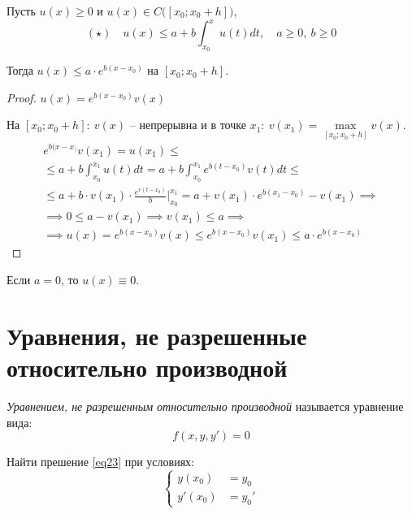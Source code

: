 

\begin{lemma}[Гронуолла]
    Пусть $u(x) \geqslant 0$ и $u(x) \in C\big([x_0;x_0+h]\big)$,
    \[
        (\star) \quad u(x)\leqslant a + b\int_{x_0}^{x}u(t)dt, \quad a\geqslant 0, \ b\geqslant 0
    \]

    Тогда $u(x)\leqslant a\cdot e^{b(x-x_0)}$ на $[x_0;x_0+h]$.
\end{lemma}

\begin{proof}
    $u(x) = e^{b(x-x_0)}v(x)$

    На $[x_0;x_0+h]: \ v(x)$ -- непрерывна и в точке $x_1: \ v(x_1) =\underset{[x_0;x_0+h]}{\max}v(x)$.
    \begin{multline*}
        e^{b(x-x_)}v(x_1) = u(x_1) \leqslant \\
        \leqslant a+b \int_{x_0}^{x_1}u(t)dt = a+b\int_{x_0}^{x_1}e^{b(t-x_0)}v(t)dt \leqslant \\
        \leqslant a+b \cdot v(x_1)\cdot \frac{e^{v(t-x_0)}}{b}\Big|_{x_0}^{x_1} = a+ v(x_1)\cdot e^{b(x_1-x_0)} - v(x_1) \implies \\
        \implies 0 \leqslant a-v(x_1) \implies v(x_1) \leqslant a \implies \\
        \implies u(x) = e^{b(x-x_0)}v(x) \leqslant e^{b(x-x_0)}v(x_1) \leqslant a\cdot e^{b(x-x_0)}
    \end{multline*}
\end{proof}

\begin{corollary}
    Если $a=0$, то $u(x) \equiv 0$.
\end{corollary}

\section{Уравнения, не разрешенные относительно производной}

\begin{definition}
    \emph{Уравнением, не разрешенным относительно производной} называется уравнение вида:
    \begin{equation}\label{eq23}
        f(x,y,y') = 0
    \end{equation}
\end{definition}

\begin{note}
    Найти прешение \ref{eq23} при условиях:
    \begin{equation}\label{eq24}
        \left\{\begin{array}{rl}
            y(x_0)  & = y_0  \\
            y'(x_0) & = y_0'
        \end{array}\right.
    \end{equation}
\end{note}

